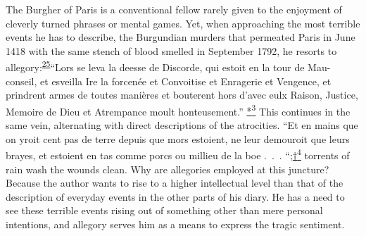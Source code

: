 The Burgher of Paris is a conventional fellow rarely given to the
enjoyment of cleverly turned phrases or mental games. Yet, when
approaching the most terrible events he has to describe, the Burgundian
murders that permeated Paris in June 1418 with the same stench of blood
smelled in September 1792, he resorts to
allegory:\textsuperscript{\protect\hypertarget{16_Chapter_Nine__THE_DECLINE_OF_SYM.xhtmlux5cux23id_744}{\protect\hyperlink{23_NOTES.xhtmlux5cux23id_745}{25}}}\protect\hypertarget{16_Chapter_Nine__THE_DECLINE_OF_SYM.xhtmlux5cux23page_245}{}{}``Lors
se leva la deesse de Discorde, qui estoit en la tour de Mau-conseil, et
esveilla Ire la forcenée et Convoitise et Enragerie et Vengence, et
prindrent armes de toutes manières et bouterent hors d'avec eulx Raison,
Justice, Memoire de Dieu et Atrempance moult honteusement.''
\protect\hypertarget{16_Chapter_Nine__THE_DECLINE_OF_SYM.xhtmlux5cux23id_2577}{\protect\hyperlink{23_NOTES.xhtmlux5cux23id_2578}{*\textsuperscript{3}}}
This continues in the same vein, alternating with direct descriptions of
the atrocities. ``Et en mains que on yroit cent pas de terre depuis que
mors estoient, ne leur demouroit que leurs brayes, et estoient en tas
comme porcs ou millieu de la boe .~.~.
``;\protect\hypertarget{16_Chapter_Nine__THE_DECLINE_OF_SYM.xhtmlux5cux23id_2579}{\protect\hyperlink{23_NOTES.xhtmlux5cux23id_2580}{†\textsuperscript{4}}}
torrents of rain wash the wounds clean. Why are allegories employed at
this juncture? Because the author wants to rise to a higher intellectual
level than that of the description of everyday events in the other parts
of his diary. He has a need to see these terrible events rising out of
something other than mere personal intentions, and allegory serves him
as a means to express the tragic sentiment.

